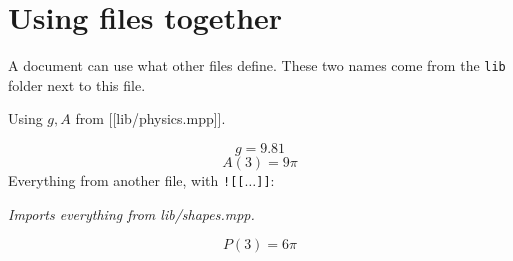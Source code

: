 \documentclass[11pt,a4paper]{article}
\theoremstyle{plain}
\theoremstyle{definition}
\theoremstyle{remark}
\begin{document}
\section*{Using files together}

A document can use what other files define. These two names come from the
\texttt{lib} folder next to this file.

Using $g, A$ from [[lib/physics.mpp]].

\begin{equation*}
  g = 9.81
\end{equation*}
\begin{equation*}
  A(3) = 9 \pi
\end{equation*}
Everything from another file, with \texttt{![[$\ldots$]]}:

\textit{Imports everything from lib/shapes.mpp.}

\begin{equation*}
  P(3) = 6 \pi
\end{equation*}
\end{document}
